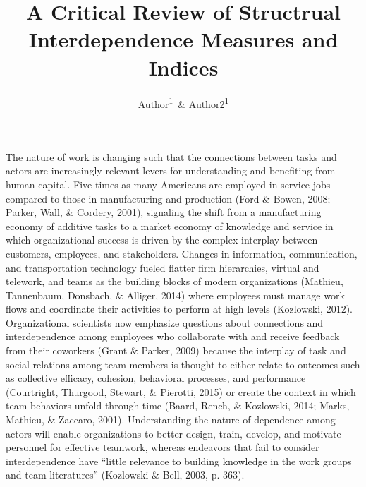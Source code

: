 \documentclass[english,,man]{apa6}
\title{A Critical Review of Structrual Interdependence Measures and Indices}
\author{Author\textsuperscript{1}~\& Author2\textsuperscript{1}}
\date{}
\affiliation{
\vspace{0.5cm}
\textsuperscript{1} Michigan State University}
\theoremstyle{definition}
\theoremstyle{definition}
\theoremstyle{definition}
\theoremstyle{remark}
\begin{document}
\maketitle

The nature of work is changing such that the connections between tasks
and actors are increasingly relevant levers for understanding and
benefiting from human capital. Five times as many Americans are employed
in service jobs compared to those in manufacturing and production (Ford
\& Bowen, 2008; Parker, Wall, \& Cordery, 2001), signaling the shift
from a manufacturing economy of additive tasks to a market economy of
knowledge and service in which organizational success is driven by the
complex interplay between customers, employees, and stakeholders.
Changes in information, communication, and transportation technology
fueled flatter firm hierarchies, virtual and telework, and teams as the
building blocks of modern organizations (Mathieu, Tannenbaum, Donsbach,
\& Alliger, 2014) where employees must manage work flows and coordinate
their activities to perform at high levels (Kozlowski, 2012).
Organizational scientists now emphasize questions about connections and
interdependence among employees who collaborate with and receive
feedback from their coworkers (Grant \& Parker, 2009) because the
interplay of task and social relations among team members is thought to
either relate to outcomes such as collective efficacy, cohesion,
behavioral processes, and performance (Courtright, Thurgood, Stewart, \&
Pierotti, 2015) or create the context in which team behaviors unfold
through time (Baard, Rench, \& Kozlowski, 2014; Marks, Mathieu, \&
Zaccaro, 2001). Understanding the nature of dependence among actors will
enable organizations to better design, train, develop, and motivate
personnel for effective teamwork, whereas endeavors that fail to
consider interdependence have \enquote{little relevance to building
knowledge in the work groups and team literatures} (Kozlowski \& Bell,
2003, p. 363).
\end{document}
